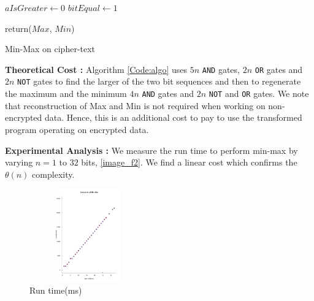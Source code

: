 \documentclass{acm_proc_article-sp}
\begin{document}

\linesnumbered

\begin{algorithm}[H]

\SetVline



 $aIsGreater \leftarrow 0$\;
 $bitEqual \leftarrow 1$\;
	


return($Max$, $Min$)

 \caption{Min-Max on cipher-text \label{Code:algo}}


\end{algorithm}


\textbf{Theoretical Cost :} Algorithm \autoref{Code:algo} uses $5n$ \texttt{AND} gates, $2n$ \texttt{OR} gates and $2n$ \texttt{NOT} gates to find the larger of the two bit sequences and then to regenerate the maximum and the minimum $4n$ \texttt{AND} gates and $2n$ \texttt{NOT} and \texttt{OR} gates. We note that reconstruction of Max and  Min is not required when working on non-encrypted data. Hence, this is an additional cost to pay to use the transformed program operating on encrypted data. 

\textbf{Experimental Analysis :} We measure the run time to perform min-max by varying $n=1$ to $32$ bits, \autoref{image_f2}. We find a linear cost which confirms the $\theta(n)$ complexity.

\begin{figure}[!h] %
\centering
\includegraphics[width=5cm,height=4cm]{f2.pdf} 
\caption{Run time(ms)} 
\label{image_f2} %
\end{figure}
\end{document}
